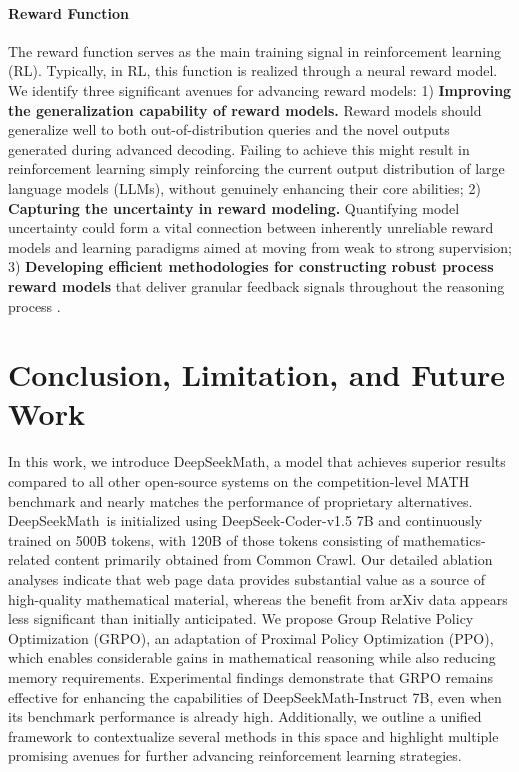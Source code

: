 \begin{itemize}[topsep=0pt]
\paragraph{Reward Function} The reward function serves as the main training signal in reinforcement learning (RL). Typically, in RL, this function is realized through a neural reward model. We identify three significant avenues for advancing reward models: 1) \textbf{Improving the generalization capability of reward models.} Reward models should generalize well to both out-of-distribution queries and the novel outputs generated during advanced decoding. Failing to achieve this might result in reinforcement learning simply reinforcing the current output distribution of large language models (LLMs), without genuinely enhancing their core abilities; 2) \textbf{Capturing the uncertainty in reward modeling.} Quantifying model uncertainty could form a vital connection between inherently unreliable reward models and learning paradigms aimed at moving from weak to strong supervision; 3) \textbf{Developing efficient methodologies for constructing robust process reward models} that deliver granular feedback signals throughout the reasoning process \citep{lightman2023let,wang2023math}.

\section{Conclusion, Limitation, and Future Work} 

In this work, we introduce DeepSeekMath, a model that achieves superior results compared to all other open-source systems on the competition-level MATH benchmark and nearly matches the performance of proprietary alternatives. DeepSeekMath~is initialized using DeepSeek-Coder-v1.5 7B and continuously trained on 500B tokens, with 120B of those tokens consisting of mathematics-related content primarily obtained from Common Crawl. Our detailed ablation analyses indicate that web page data provides substantial value as a source of high-quality mathematical material, whereas the benefit from arXiv data appears less significant than initially anticipated. We propose Group Relative Policy Optimization (GRPO), an adaptation of Proximal Policy Optimization (PPO), which enables considerable gains in mathematical reasoning while also reducing memory requirements. Experimental findings demonstrate that GRPO remains effective for enhancing the capabilities of DeepSeekMath-Instruct 7B, even when its benchmark performance is already high. Additionally, we outline a unified framework to contextualize several methods in this space and highlight multiple promising avenues for further advancing reinforcement learning strategies.


\end{itemize}
